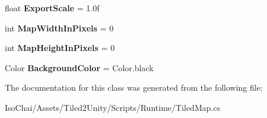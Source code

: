 \begin{DoxyCompactItemize}
\mbox{\label{class_tiled2_unity_1_1_tiled_map_a608dfffdbb33b68d4f810e4e0c1e97c4}} 
float {\bfseries Export\+Scale} = 1.\+0f
\item 
\mbox{\label{class_tiled2_unity_1_1_tiled_map_aa494770e2f38b482a4adee6990e687ab}} 
int {\bfseries Map\+Width\+In\+Pixels} = 0
\item 
\mbox{\label{class_tiled2_unity_1_1_tiled_map_a6a10e2ec0f364481ae2268ab8bb40941}} 
int {\bfseries Map\+Height\+In\+Pixels} = 0
\item 
\mbox{\label{class_tiled2_unity_1_1_tiled_map_aa3ec5f9703ec523511b17561fa736eda}} 
Color {\bfseries Background\+Color} = Color.\+black
\end{DoxyCompactItemize}


The documentation for this class was generated from the following file\+:\begin{DoxyCompactItemize}
\item 
Iso\+Chai/\+Assets/\+Tiled2\+Unity/\+Scripts/\+Runtime/Tiled\+Map.\+cs\end{DoxyCompactItemize}
